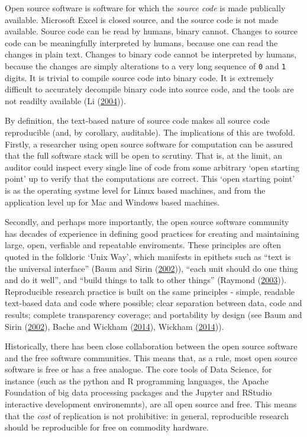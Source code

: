 \documentclass[11pt,preprint, authoryear]{elsarticle}
\numberwithin{equation}{section}
\numberwithin{figure}{section}
\numberwithin{table}{section}
\begin{document}
Open source software is software for which the \emph{source code} is
made publically available. Microsoft Excel is closed source, and the
source code is not made available. Source code can be read by humans,
binary cannot. Changes to source code can be meaningfully interpreted by
humans, because one can read the changes in plain text. Changes to
binary code cannot be interpreted by humans, because the changes are
simply alterations to a very long sequence of \texttt{0} and \texttt{1}
digits. It is trivial to compile source code into binary code. It is
extremely difficult to accurately decompile binary code into source
code, and the tools are not readilty available (Li
(\protect\hyperlink{ref-Li2004}{2004})).

By definition, the text-based nature of source code makes all source
code reproducible (and, by corollary, auditable). The implications of
this are twofold. Firstly, a researcher using open source software for
computation can be assured that the full software stack will be open to
scrutiny. That is, at the limit, an auditor could inspect every single
line of code from some arbitrary `open starting point' up to verify that
the computations are correct. This `open starting point' is as the
operating systme level for Linux based machines, and from the
application level up for Mac and Windows based machines.

Secondly, and perhaps more importantly, the open source software
community has decades of experience in defining good practices for
creating and maintaining large, open, verfiable and repeatable
enviroments. These principles are often quoted in the folkloric `Unix
Way', which manifests in epithets such as ``text is the universal
interface'' (Baum and Sirin (\protect\hyperlink{ref-Baum2002}{2002})),
``each unit should do one thing and do it well'', and ``build things to
talk to other things'' (Raymond
(\protect\hyperlink{ref-Raymond:2003:AUP:829549}{2003})). Reproducible
research practice is built on the same principles - simple, readable
text-based data and code where possible; clear separation between data,
code and results; complete transparency coverage; and portability by
design (see Baum and Sirin (\protect\hyperlink{ref-Baum2002}{2002}),
Bache and Wickham (\protect\hyperlink{ref-Bache2014}{2014}), Wickham
(\protect\hyperlink{ref-Wickham2014}{2014})).

Historically, there has been close collaboration between the open source
software and the free software communities. This means that, as a rule,
most open source software is free or has a free analogue. The core tools
of Data Science, for instance (such as the python and R programming
languages, the Apache Foundation of big data processing packages and the
Jupyter and RStudio interactive development environemnts), are all open
source and free. This means that the \emph{cost} of replication is not
prohibitive: in general, reproducible research should be reproducible
for free on commodity hardware.
\end{document}
